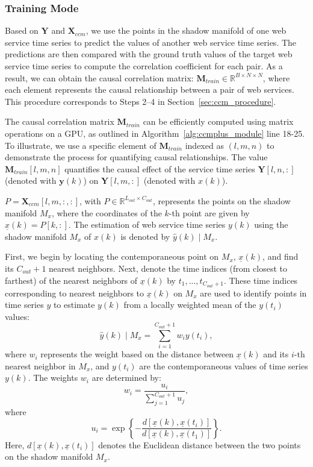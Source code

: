 \subsubsection{Training Mode}
Based on $\mathbf{Y}$ and $\mathbf{X}_{ccm}$, we use the points in the shadow manifold of one web service time series to predict the values of another web service time series. The predictions are then compared with the ground truth values of the target web service time series to compute the correlation coefficient for each pair. 
As a result, we can obtain the causal correlation matrix: $ \mathbf{M}_{train} \in \mathbb{R}^{B\times N\times N}$, where each element represents the causal relationship between a pair of web services. This procedure corresponds to Steps 2–4 in Section~\ref{sec:ccm_procedure}.

The causal correlation matrix $\mathbf{M}_{train}$ can be efficiently computed using matrix operations on a GPU, as outlined in Algorithm~\ref{alg:ccmplus_module} line 18-25. 
To illustrate, we use a specific element of \( \mathbf{M}_{train} \) indexed as \( (l, m, n) \) to demonstrate the process for quantifying causal relationships. The value \( \mathbf{M}_{train}[l, m, n] \) quantifies the causal effect of the service time series \( \mathbf{Y}[l, n, :] \) (denoted with $\mathbf{y}(k)$) on \( \mathbf{Y}[l, m, :] \) (denoted with $x(k)$). 


\( P = \mathbf{X}_{ccm}[l, m, :, :] \), with \( P \in \mathbb{R}^{L_{out} \times C_{out}} \), represents the points on the shadow manifold \( M_x \), where the coordinates of the \( k \)-th point are given by \( \underline{x}(k) = P[k, :] \). The estimation of web service time series $y(k)$ using the shadow manifold $M_x$ of $x(k)$ is denoted by $\hat{y}(k) \mid M_x$.

First, we begin by locating the contemporaneous point on $M_x$, $\underline{x}(k)$, and find its $C_{out}+1$ nearest neighbors. Next, denote the time indices (from closest to farthest) of the nearest neighbors of $\underline{x}(k)$ by $t_{1},...,t_{C_{out}+1}$. These time indices corresponding to nearest neighbors to $\underline{x}(k)$ on $M_{x}$ are used to identify points in time series $y$ to estimate $y(k)$ from a locally weighted mean of the $y(t_i)$ values:
\begin{equation}
    \hat{y}(k) \mid M_x = \sum_{i=1}^{C_{out}+1} w_i y(t_i),\nonumber
\end{equation}
where \( w_i \) represents the weight based on the distance between \( \underline{x}(k) \) and its \( i{\text{-th}} \) nearest neighbor in \( M_x \), and \( y(t_i) \) are the contemporaneous values of time series \( y(k) \). The weights \( w_i \) are determined by:
    \begin{equation}
    w_i = \frac{u_i}{\sum_{j=1}^{C_{out}+1} u_j},\nonumber
    \end{equation}
    where
    \begin{equation}
    u_i = \exp \left\{ -\frac{d[\underline{x}(k), \underline{x}(t_i)]}{d[\underline{x}(k), \underline{x}(t_1)]} \right\}.\nonumber
    \end{equation}
    Here, \( d[\underline{x}(k), \underline{x}(t_i)] \) denotes the Euclidean distance between the two points on the shadow manifold $M_x$.


